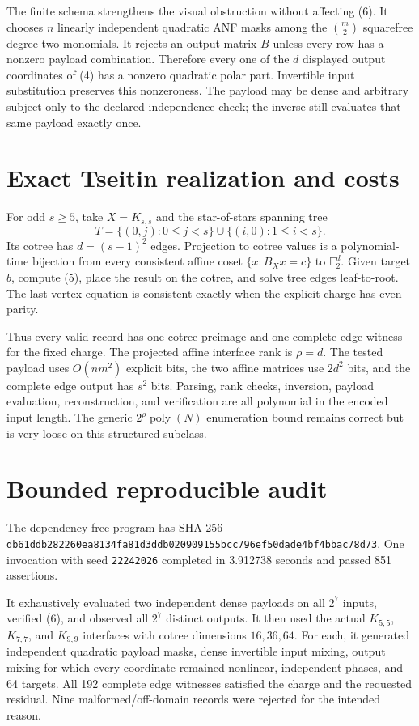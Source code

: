 \documentclass[11pt]{article}
\newcommand{\F}{\mathbb F_2}
\begin{document}
The finite schema strengthens the visual obstruction without affecting (6).
It chooses $n$ linearly independent quadratic ANF masks among the
$\binom m2$ squarefree degree-two monomials.  It rejects an output matrix $B$
unless every row has a nonzero payload combination.  Therefore every one of
the $d$ displayed output coordinates of (4) has a nonzero quadratic polar
part.  Invertible input substitution preserves this nonzeroness.  The payload
may be dense and arbitrary subject only to the declared independence check;
the inverse still evaluates that same payload exactly once.

\section{Exact Tseitin realization and costs}
For odd $s\ge5$, take $X=K_{s,s}$ and the star-of-stars spanning tree
\[
 T=\{(0,j):0\le j<s\}\cup\{(i,0):1\le i<s\}.
\]
Its cotree has $d=(s-1)^2$ edges.  Projection to cotree values is a
polynomial-time bijection from every consistent affine coset
$\{x:B_Xx=c\}$ to $\F^d$.  Given target $b$, compute (5), place the result on
the cotree, and solve tree edges leaf-to-root.  The last vertex equation is
consistent exactly when the explicit charge has even parity.

Thus every valid record has one cotree preimage and one complete edge witness
for the fixed charge.  The projected affine interface rank is $\rho=d$.  The
tested payload uses $O(nm^2)$ explicit bits, the two affine matrices use
$2d^2$ bits, and the complete edge output has $s^2$ bits.  Parsing, rank
checks, inversion, payload evaluation, reconstruction, and verification are
all polynomial in the encoded input length.  The generic
$2^\rho\operatorname{poly}(N)$ enumeration bound remains correct but is very
loose on this structured subclass.

\section{Bounded reproducible audit}
The dependency-free program
has SHA-256
\texttt{db61ddb282260ea8134fa81d3ddb020909155bcc796ef50dade4bf4bbac78d73}.
One invocation with seed \texttt{22242026} completed in 3.912738 seconds and
passed 851 assertions.

It exhaustively evaluated two independent dense payloads on all $2^7$
inputs, verified (6), and observed all $2^7$ distinct outputs.  It then used
the actual $K_{5,5}$, $K_{7,7}$, and $K_{9,9}$ interfaces with cotree
dimensions $16,36,64$.  For each, it generated independent quadratic
payload masks, dense invertible input mixing, output mixing for which every
coordinate remained nonlinear, independent phases, and 64 targets.  All 192
complete edge witnesses satisfied the charge and the requested residual.
Nine malformed/off-domain records were rejected for the intended reason.
\end{document}
